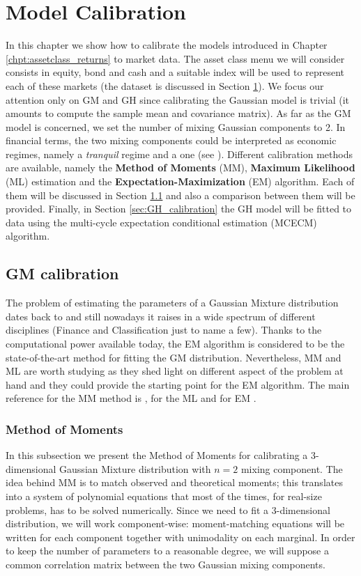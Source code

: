 \chapter{Model Calibration}
In this chapter we show how to calibrate the models introduced in Chapter \ref{chpt:assetclass_returns} to market data. The asset class menu we will consider consists in equity, bond and cash and a suitable index will be used to represent each of these markets (the dataset is discussed in Section \ref{}). We focus our attention only on GM and GH since calibrating the Gaussian model is trivial (it amounts to compute the sample mean and covariance matrix). As far as the GM model is concerned, we set the number of mixing Gaussian components to 2. In financial terms, the two mixing components could be interpreted as economic regimes, namely a \textit{tranquil} regime and a  one (see \cite{Brey2013}). Different calibration methods are available, namely the \textbf{Method of Moments} (MM), \textbf{Maximum Likelihood} (ML) estimation  and the \textbf{Expectation-Maximization} (EM) algorithm. Each of them will be discussed in Section \ref{sec:GM_calibration} and also a comparison between them will be provided. Finally, in Section \ref{sec:GH_calibration} the GH model will be fitted to data using the multi-cycle expectation conditional estimation (MCECM) algorithm. 
\section{GM calibration} \label{sec:GM_calibration}
The problem of estimating the parameters of a Gaussian Mixture distribution dates back to \cite{Pearson1894} and still nowadays it raises in a wide spectrum of different disciplines (Finance and Classification just to name a few). Thanks to the computational power available today, the EM algorithm is considered to be the state-of-the-art method for fitting the GM distribution. Nevertheless, MM and ML are worth studying as they shed light on different aspect of the problem at hand and they could provide the starting point for the EM algorithm. The main reference for the MM method is \cite{Everitt81}, for the ML \cite{casella2002} and for EM \cite{McNeil2005}.
\subsection{Method of Moments}\label{subsec:MM}
In this subsection we present the Method of Moments for calibrating a 3-dimensional Gaussian Mixture distribution with $n=2$ mixing component. The idea behind MM is to match observed and theoretical moments; this translates into a system of polynomial equations that most of the times, for real-size problems, has to be solved numerically. Since we need to fit a 3-dimensional distribution, we will work component-wise: moment-matching equations will be written  for each component together with unimodality on each marginal. In order to keep the number of parameters to a reasonable degree, we will suppose a common correlation matrix between the two Gaussian mixing components.

